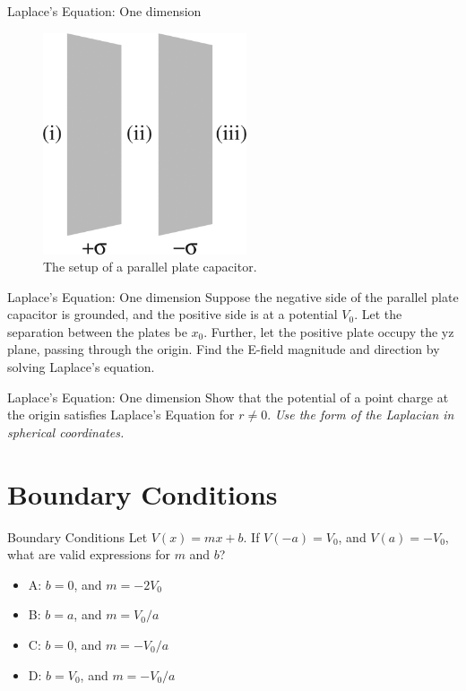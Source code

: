 \documentclass{beamer}
\begin{document}
\begin{frame}{Laplace's Equation: One dimension}
\begin{figure}
\centering
\includegraphics[width=6cm]{figures/2_23.jpg}
\caption{\label{fig:cap} The setup of a parallel plate capacitor.}
\end{figure}
\end{frame}

\begin{frame}{Laplace's Equation: One dimension}
\small
Suppose the negative side of the parallel plate capacitor is grounded, and the positive side is at a potential $V_0$.  Let the separation between the plates be $x_0$.  Further, let the positive plate occupy the yz plane, passing through the origin.  Find the E-field magnitude and direction by solving Laplace's equation. \\ \vspace{6cm}
\end{frame}

\begin{frame}{Laplace's Equation: One dimension}
\small
Show that the potential of a point charge at the origin satisfies Laplace's Equation for $r\neq 0$.  \textit{Use the form of the Laplacian in spherical coordinates.}\\ \vspace{6cm}
\end{frame}

\section{Boundary Conditions}

\begin{frame}{Boundary Conditions}
Let $V(x) = m x + b$.  If $V(-a) = V_0$, and $V(a) = -V_0$, what are valid expressions for $m$ and $b$?
\begin{itemize}
\item A: $b = 0$, and $m = -2V_0$
\item B: $b = a$, and $m = V_0/a$
\item C: $b = 0$, and $m = -V_0/a$
\item D: $b = V_0$, and $m = -V_0/a$
\end{itemize}
\end{frame}
\end{document}
